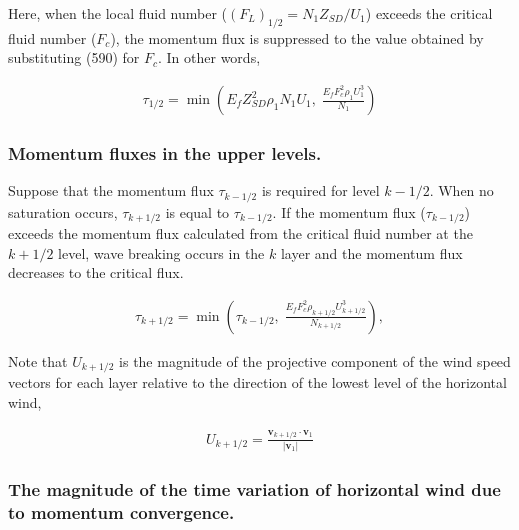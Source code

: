 Here, when the local fluid number (\((F_L)_{1/2} = N_1 Z_{SD}/U_1\))
exceeds the critical fluid number (\(F_c\)), the momentum flux is
suppressed to the value obtained by substituting (590) for \(F_c\). In
other words,

\begin{eqnarray}
  \tau_{1/2} = \min \left(
                   E_f Z_{SD}^{2} \rho_1 N_1 U_1, \; 
                  \frac{E_f F_c^{2} \rho_1 U_1^3}{N_1}
               \right)
\end{eqnarray}

\hypertarget{momentum-fluxes-in-the-upper-levels.}{%
\subsubsection{Momentum fluxes in the upper
levels.}\label{momentum-fluxes-in-the-upper-levels.}}

Suppose that the momentum flux \(\tau_{k-1/2}\) is required for level
\(k-1/2\). When no saturation occurs, \(\tau_{k+1/2}\) is equal to
\(\tau_{k-1/2}\). If the momentum flux (\(\tau_{k-1/2}\)) exceeds the
momentum flux calculated from the critical fluid number at the \(k+1/2\)
level, wave breaking occurs in the \(k\) layer and the momentum flux
decreases to the critical flux.

\begin{eqnarray}
  \tau_{k+1/2} = \min \left( 
               \tau_{k-1/2}, \;
               \frac{E_f F_c^2 \rho_{k+1/2} U_{k+1/2}^3}{N_{k+1/2}}
                      \right),
\end{eqnarray}

Note that \(U_{k+1/2}\) is the magnitude of the projective component of
the wind speed vectors for each layer relative to the direction of the
lowest level of the horizontal wind,

\begin{eqnarray}
  U_{k+1/2} = \frac{{\mathbf v}_{k+1/2} 
                      \cdot {\mathbf v}_{1}}
                   {|{\mathbf v}_{1}|       }
\end{eqnarray}

\hypertarget{the-magnitude-of-the-time-variation-of-horizontal-wind-due-to-momentum-convergence.}{%
\subsubsection{The magnitude of the time variation of horizontal wind
due to momentum
convergence.}\label{the-magnitude-of-the-time-variation-of-horizontal-wind-due-to-momentum-convergence.}}

